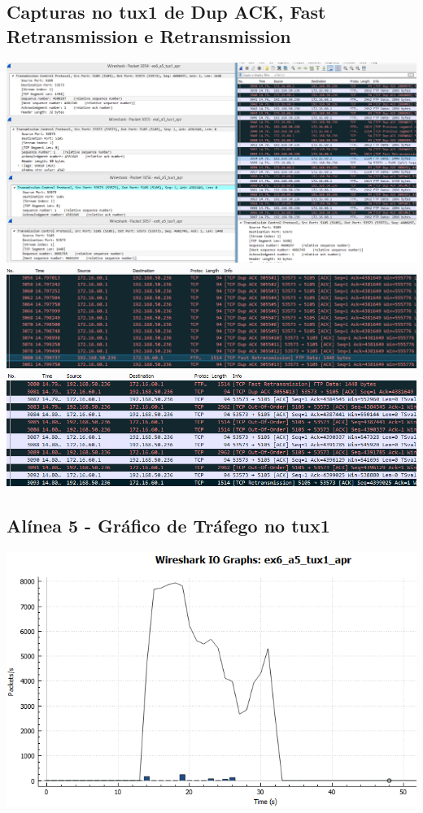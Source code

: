 \documentclass[11pt,a4paper,reqno]{report}
\numberwithin{equation}{section}
\begin{document}
\begin{appendices}
\subsection{Capturas no tux1 de Dup ACK, Fast Retransmission e Retransmission}
\label{ex6_retrans}
\includegraphics[width=18cm]{ex6_tux1_3054.png}
\includegraphics[width=18cm]{ex6_tux1_fastretransmission.png}
\includegraphics[width=18cm]{ex6_tux1_retransmission.png}

\subsection{Alínea 5 - Gráfico de Tráfego no tux1}
\label{ex6_a5_1io}
\includegraphics[width=18cm]{ex6_a5_tux1_IO.png}

\end{appendices}
\end{document}
